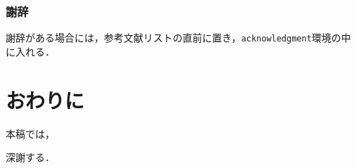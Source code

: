 \documentclass[submit,noauthor]{ono}
\def\|{\verb|}
\begin{document}
%4.7.3
\subsubsection{謝辞}

謝辞がある場合には，参考文献リストの直前に置き，\|acknowledgment|環境の中に入れる．



\section{おわりに}

本稿では，



\begin{acknowledgment}
	深謝する．
\end{acknowledgment}

\begin{thebibliography}{2}
\end{thebibliography}
\end{document}
